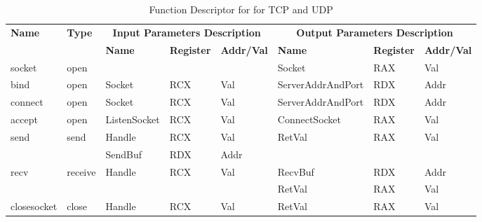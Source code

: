 \begin{table}[H]
  \centering
  \caption{Function Descriptor for for TCP and UDP}
  \label{tcpupdfunctions}
\begin{tabular}{|l|l|l|l|l|l|l|l|}
\hline
             \multirow{2}{*}{{\textbf{Name}}} & \multirow{2}{*}{{\textbf{Type}}} & \multicolumn{3}{c|}{\textbf{Input Parameters Description}} & \multicolumn{3}{c|}{\textbf{Output Parameters Description}} \\
              \cline{3-8} 
             & & \textbf{Name}& \textbf{Register} & \textbf{Addr/Val} & \textbf{Name}& \textbf{Register} &  \textbf{Addr/Val}  \\
             \hline
      socket
       &open &  &   &  &  Socket & RAX & Val\\ 
      \hline
      bind
       &open & Socket &  RCX & Val &  ServerAddrAndPort & RDX & Addr\\
      \hline   
            connect
       &open & Socket &  RCX & Val &  ServerAddrAndPort & RDX & Addr\\
      \hline   
     accept
       &open &  ListenSocket & RCX & Val & ConnectSocket & RAX & Val\\
      \hline                    
      \multirow{2}{*}{send}
       &\multirow{2}{*}{send} &  Handle & RCX & Val & \multirow{2}{*}{RetVal}& \multirow{2}{*}{RAX} & \multirow{2}{*}{Val} \\
       \cline{3-5}
      & & SendBuf& RDX&Addr &  &  & \\
      \hline            
      \multirow{2}{*}{recv}
       &\multirow{2}{*}{receive}&  \multirow{2}{*}{Handle} & \multirow{2}{*}{RCX} & \multirow{2}{*}{Val}& RecvBuf& RDX&Addr\\
       \cline{6-8}
      & &  &   &  &  RetVal & RAX & Val\\ 
      \hline      
      closesocket &
       close &  Handle & RCX & Val & RetVal & RAX & Val\\
      \hline                          
  \end{tabular}    
\end{table}

